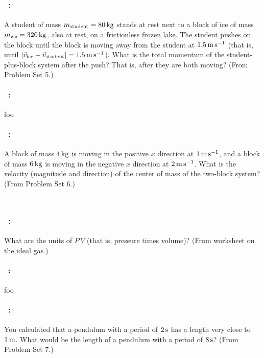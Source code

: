 \documentclass[12pt]{article} 
\begin{document}
\vfill
~
\clearpage

\paragraph{\problemname~\theproblem:}%
A student of mass $m_\mathrm{student}=80\,\mathrm{kg}$ stands at rest next to
a block of ice of mass $m_\mathrm{ice}=320\,\mathrm{kg}$, also at rest, on a
frictionless frozen lake.  The student pushes on the block until the
block is moving away from the student at $1.5\,\mathrm{m}\,\mathrm{s}^{-1}$ (that is, until
$\left|\vec{v}_\mathrm{ice}-\vec{v}_\mathrm{student}\right|=1.5\,\mathrm{m}\,\mathrm{s}^{-1}$).
What is the total momentum of the student-plus-block system after the
push? That is, after they are both moving?
(From Problem Set 5.)

\vfill

\paragraph{\problemname~\theproblem:}%
foo

\vfill

\paragraph{\problemname~\theproblem:}%
A block of mass $4\,\mathrm{kg}$ is moving in the positive $x$ direction at
$1\,\mathrm{m}\,\mathrm{s}^{-1}$, and a block of mass $6\,\mathrm{kg}$ is moving in the negative $x$ direction
at $2\,\mathrm{m}\,\mathrm{s}^{-1}$. What is the velocity (magnitude and direction) of the
center of mass of the two-block system?
(From Problem Set 6.)

\vfill
~
\clearpage

\paragraph{\problemname~\theproblem:}%
What are the units of $P\,V$ (that is, pressure times volume)?
(From worksheet on the ideal gas.)

\vfill

\paragraph{\problemname~\theproblem:}%
foo

\vfill

\paragraph{\problemname~\theproblem:}%
You calculated that a pendulum with a period of $2\,\mathrm{s}$ has a length
very close to $1\,\mathrm{m}$. What would be the length of a pendulum with
a period of $8\,\mathrm{s}$? (From Problem Set 7.)
\end{document}
